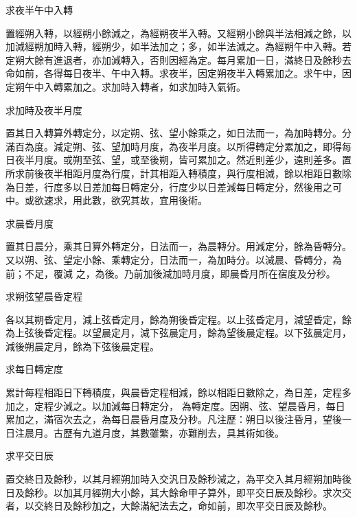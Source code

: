 \begin{pinyinscope}
 求夜半午中入轉



 置經朔入轉，以經朔小餘減之，為經朔夜半入轉。又經朔小餘與半法相減之餘，以加減經朔加時入轉，經朔少，如半法加之；多，如半法減之。為經朔午中入轉。若定朔大餘有進退者，亦加減轉入，否則因經為定。每月累加一日，滿終日及餘秒去命如前，各得每日夜半、午中入轉。求夜半，因定朔夜半入轉累加之。求午中，因定朔午中入轉累加之。求加時入轉者，如求加時入氣術。



 求加時及夜半月度



 置其日入轉算外轉定分，以定朔、弦、望小餘乘之，如日法而一，為加時轉分。分滿百為度。減定朔、弦、望加時月度，為夜半月度。以所得轉定分累加之，即得每日夜半月度。或朔至弦、望，或至後朔，皆可累加之。然近則差少，遠則差多。置所求前後夜半相距月度為行度，計其相距入轉積度，與行度相減，餘以相距日數除為日差，行度多以日差加每日轉定分，行度少以日差減每日轉定分，然後用之可中。或欲速求，用此數，欲究其故，宜用後術。



 求晨昏月度



 置其日晨分，乘其日算外轉定分，日法而一，為晨轉分。用減定分，餘為昏轉分。又以朔、弦、望定小餘、乘轉定分，日法而一，為加時分。以減晨、昏轉分，為前；不足，覆減
 之，為後。乃前加後減加時月度，即晨昏月所在宿度及分秒。



 求朔弦望晨昏定程



 各以其朔昏定月，減上弦昏定月，餘為朔後昏定程。以上弦昏定月，減望昏定，餘為上弦後昏定程。以望晨定月，減下弦晨定月，餘為望後晨定程。以下弦晨定月，減後朔晨定月，餘為下弦後晨定程。



 求每日轉定度



 累計每程相距日下轉積度，與晨昏定程相減，餘以相距日數除之，為日差，定程多加之，定程少減之。以加減每日轉定分，
 為轉定度。因朔、弦、望晨昏月，每日累加之，滿宿次去之，為每日晨昏月度及分秒。凡注歷：朔日以後注昏月，望後一日注晨月。古歷有九道月度，其數雖繁，亦難削去，具其術如後。



 求平交日辰



 置交終日及餘秒，以其月經朔加時入交汎日及餘秒減之，為平交入其月經朔加時後日及餘秒。以加其月經朔大小餘，其大餘命甲子算外，即平交日辰及餘秒。求次交者，以交終日及餘秒加之，大餘滿紀法去之，命如前，即次平交日辰及餘秒。




\end{pinyinscope}
